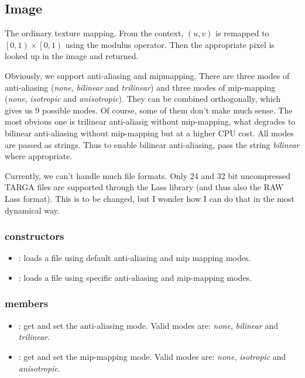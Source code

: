 \subsection{Image}

The ordinary texture mapping.  From the context, $\left(u, v\right)$ is remapped to $\left[0, 1\right) \times \left[0, 1\right)$ using the modulus operator.  Then the appropriate pixel is looked up in the image and returned.

Obviously, we support anti-aliasing and mipmapping.  There are three modes of anti-aliasing (\emph{none}, \emph{bilinear} and \emph{trilinear}) and three modes of mip-mapping (\emph{none}, \emph{isotropic} and \emph{anisotropic}).  They can be combined orthogonally, which gives us 9 possible modes.  Of course, some of them don't make much sense.  The most obvious one is trilinear anti-aliasig without mip-mapping, what degrades to bilinear anti-aliasing without mip-mapping but at a higher CPU cost.  All modes are passed as strings.  Thus to enable bilinear anti-aliasing, pass the string \emph{bilinear} where appropriate.

Currently, we can't handle much file formats.  Only 24 and 32 bit uncompressed TARGA files are supported through the Lass library (and thus also the RAW Lass format).  This is to be changed, but I wonder how I can do that in the most dynamical way.

\subsubsection*{constructors}
\begin{itemize}
	\item {}: 
		loads a file using default anti-aliasing and mip mapping modes.
	\item {}: 
		loads a file using specific anti-aliasing and mip-mapping modes.  
\end{itemize}

\subsubsection*{members}
\begin{itemize}
	\item {}: 
		get and set the anti-aliasing mode.  Valid modes are: \emph{none}, \emph{bilinear} and \emph{trilinear}.
	\item {}: 
		get and set the mip-mapping mode.  Valid modes are: \emph{none}, \emph{isotropic} and \emph{anisotropic}.
\end{itemize}

